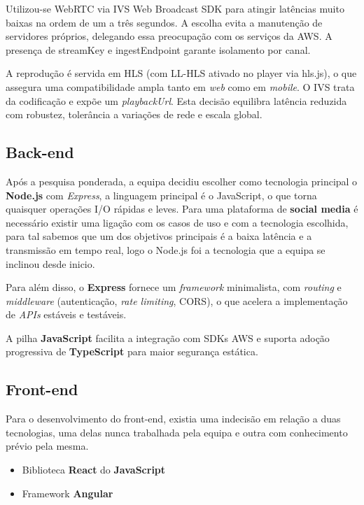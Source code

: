 Utilizou-se WebRTC via IVS Web Broadcast SDK para atingir latências muito baixas na ordem de um a três segundos. A escolha evita a manutenção de servidores próprios, delegando essa preocupação com os serviços da AWS. A presença de streamKey e ingestEndpoint garante isolamento por canal.

A reprodução é servida em HLS (com LL-HLS ativado no player via hls.js), o que assegura uma compatibilidade ampla tanto em \textit{web} como em \textit{mobile}. O IVS trata da codificação e expõe um \textit{playbackUrl}. Esta decisão equilibra latência reduzida com robustez, tolerância a variações de rede e escala global.

\subsection{Back-end}

Após a pesquisa ponderada, a equipa decidiu escolher como tecnologia principal o \textbf{Node.js} com \textit{Express}, a linguagem principal é o JavaScript, o que torna quaisquer operações \gls{I/O} rápidas e leves. Para uma plataforma de \textbf{social media} é necessário existir uma ligação com os casos de uso e com a tecnologia escolhida, para tal sabemos que um dos objetivos principais é a baixa latência e a transmissão em tempo real, logo o Node.js foi a tecnologia que a equipa se inclinou desde inicio.

Para além disso, o \textbf{Express} fornece um \textit{framework} minimalista, com \textit{routing} e \textit{middleware} (autenticação, \textit{rate limiting}, CORS), o que acelera a implementação de \textit{APIs} estáveis e testáveis.

A pilha \textbf{JavaScript} facilita a integração com SDKs AWS e suporta adoção progressiva de \textbf{TypeScript} para maior segurança estática.

\subsection{Front-end}

Para o desenvolvimento do front-end, existia uma indecisão em relação a duas
tecnologias, uma delas nunca trabalhada pela equipa e outra com conhecimento prévio pela mesma.

\begin{itemize}
    \item Biblioteca \textbf{React} do \textbf{JavaScript}
    \item Framework \textbf{Angular}
\end{itemize}

